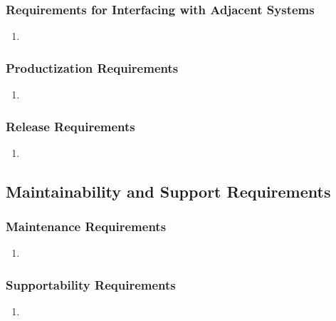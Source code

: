 \documentclass[]{article}
\begin{document}
\subsubsection{Requirements for Interfacing with Adjacent Systems}
\label{ssub:requirements_for_interfacing_with_adjacent_systems}
\begin{enumerate}[{OE}1. ]
	\item 
\end{enumerate}

\subsubsection{Productization Requirements}
\label{ssub:productization_requirements}
\begin{enumerate}[{OE}1. ]
	\item 
\end{enumerate}

\subsubsection{Release Requirements}
\label{ssub:release_requirements}
\begin{enumerate}[{OE}1. ]
	\item 
\end{enumerate}


\subsection{Maintainability and Support Requirements}
\label{sub:maintainability_and_support_requirements}

\subsubsection{Maintenance Requirements}
\label{ssub:maintenance_requirements}
\begin{enumerate}[{MS}1. ]
	\item 
\end{enumerate}

\subsubsection{Supportability Requirements}
\label{ssub:supportability_requirements}
\begin{enumerate}[{MS}1. ]
	\item 
\end{enumerate}
\end{document}
